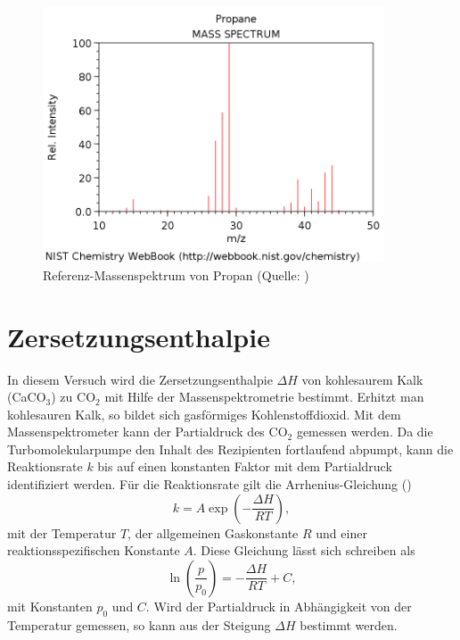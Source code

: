 \begin{figure}[ph]
	\centering\includegraphics[width=0.9\textwidth]{fig/propan.png}
	\caption{Referenz-Massenspektrum von Propan (Quelle: \cite{Nist})}
	\label{fig:v54}
\end{figure}

\section{Zersetzungsenthalpie}

In diesem Versuch wird die Zersetzungsenthalpie $\Delta H$ von kohlesaurem Kalk (CaCO$_{3}$) zu CO$_{2}$ mit Hilfe der Massenspektrometrie bestimmt.
Erhitzt man kohlesauren Kalk, so bildet sich gasförmiges Kohlenstoffdioxid. Mit dem Massenspektrometer kann der Partialdruck des CO$_{2}$ gemessen werden. Da die Turbomolekularpumpe den Inhalt des Rezipienten fortlaufend abpumpt, kann die Reaktionsrate $k$ bis auf einen konstanten Faktor mit dem Partialdruck identifiziert werden.
Für die Reaktionsrate gilt die Arrhenius-Gleichung (\cite{wiki:arrh})
\begin{equation}
 k = A \exp\left(-\frac{\Delta H}{RT} \right),
\end{equation}
mit der Temperatur $T$, der allgemeinen Gaskonstante $R$ und einer reaktionsspezifischen Konstante $A$. Diese Gleichung lässt sich schreiben als
\begin{equation}
 \ln\left(\frac{p}{p_{0}}\right) = -\frac{\Delta H}{RT} + C,
\end{equation}
mit Konstanten $p_{0}$ und $C$. Wird der Partialdruck in Abhängigkeit von der Temperatur gemessen, so kann aus der Steigung $\Delta H$ bestimmt werden.


